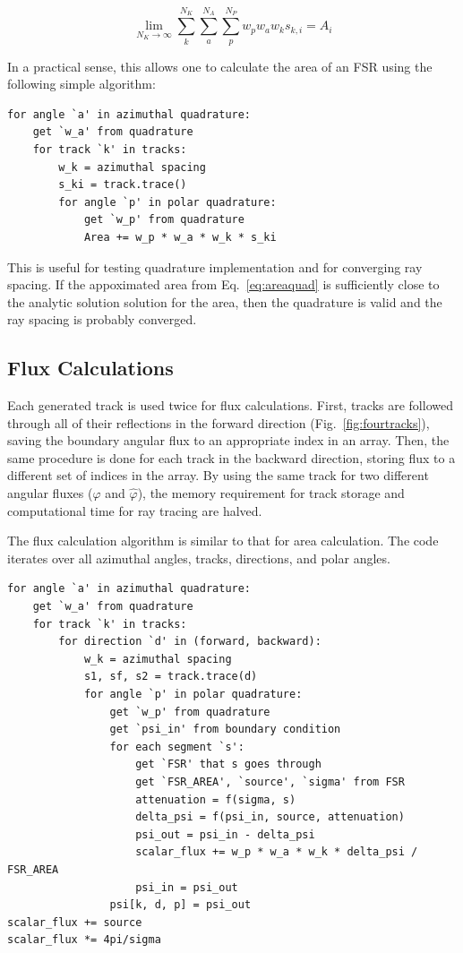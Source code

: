\documentclass[12pt]{article}
\begin{document}
\begin{equation}\label{eq:areaquad}
\lim\limits_{N_K \rightarrow \infty} \sum\limits_k^{N_K}
\sum\limits_a^{N_A} \sum\limits_p^{N_P} w_p w_a w_k s_{k,i} = A_i
\end{equation}

In a practical sense, this allows one to calculate the area of an FSR using the following simple algorithm:

\begin{verbatim}
for angle `a' in azimuthal quadrature:
    get `w_a' from quadrature
    for track `k' in tracks:
        w_k = azimuthal spacing 
        s_ki = track.trace()
        for angle `p' in polar quadrature:
            get `w_p' from quadrature
            Area += w_p * w_a * w_k * s_ki
\end{verbatim}

This is useful for testing quadrature implementation and for converging ray spacing. If the appoximated area from Eq.~\ref{eq:areaquad} is sufficiently close to the analytic solution solution for the area, then the quadrature is valid and the ray spacing is probably converged.


\subsection{Flux Calculations}\label{sec:flux}

Each generated track is used twice for flux calculations. First, tracks are followed through all of their reflections in the forward direction (Fig.~\ref{fig:fourtracks}), saving the boundary angular flux to an appropriate index in an array. Then, the same procedure is done for each track in the backward direction, storing flux to a different set of indices in the array. By using the same track for two different angular fluxes ($\varphi$ and $\hat{\varphi}$), the memory requirement for track storage and computational time for ray tracing are halved.

The flux calculation algorithm is similar to that for area calculation. The code iterates over all azimuthal angles, tracks, directions, and polar angles.


\begin{verbatim}
for angle `a' in azimuthal quadrature:
    get `w_a' from quadrature
    for track `k' in tracks:
        for direction `d' in (forward, backward):
            w_k = azimuthal spacing 
           	s1, sf, s2 = track.trace(d)
            for angle `p' in polar quadrature:
                get `w_p' from quadrature
                get `psi_in' from boundary condition
                for each segment `s':
                    get `FSR' that s goes through
                    get `FSR_AREA', `source', `sigma' from FSR
                    attenuation = f(sigma, s)
                    delta_psi = f(psi_in, source, attenuation)
                    psi_out = psi_in - delta_psi
                    scalar_flux += w_p * w_a * w_k * delta_psi / FSR_AREA
                    psi_in = psi_out
                psi[k, d, p] = psi_out
scalar_flux += source
scalar_flux *= 4pi/sigma
\end{verbatim}
\end{document}
